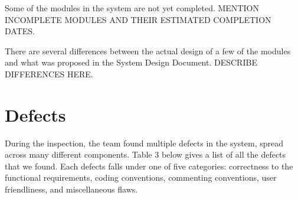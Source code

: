 \documentclass{article}
\begin{document}
Some of the modules in the system are not yet completed. MENTION INCOMPLETE MODULES AND THEIR ESTIMATED COMPLETION DATES.

There are several differences between the actual design of a few of the modules and what was proposed in the System Design Document. DESCRIBE DIFFERENCES HERE.

\section{Defects}

During the inspection, the team found multiple defects in the system, spread across many different components. Table 3 below gives a list of all the defects that we found. Each defects falls under one of five categories: correctness to the functional requirements, coding conventions, commenting conventions, user friendliness, and miscellaneous flaws.

\newpage
\end{document}
